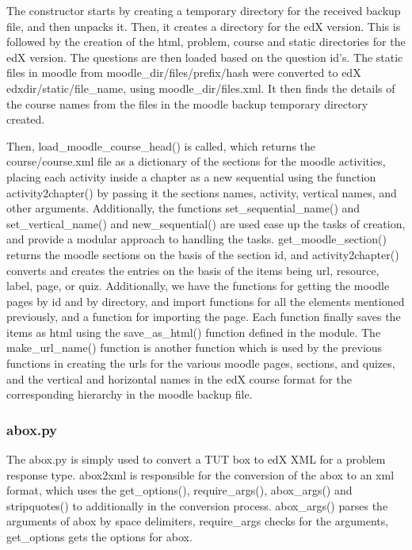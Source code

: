 \documentclass[14pt]{article}
\begin{document}
The constructor starts by creating a temporary directory for the received backup file, and then unpacks it. Then, it creates a directory for the edX version. This is followed by the creation of the html, problem, course and static directories for the edX version. The questions are then loaded based on the question id's. The static files in moodle from moodle\_dir/files/prefix/hash were  converted to edX edxdir/static/file\_name, using moodle\_dir/files.xml. It then finds the details of the course names from the files in the moodle backup temporary directory created.

Then, load\_moodle\_course\_head() is called, which returns the course/course.xml file as a dictionary of the sections for the moodle activities, placing each activity inside a chapter as a new sequential using the function activity2chapter() by passing it the sections names, activity, vertical names, and other arguments. Additionally, the functions set\_sequential\_name() and set\_vertical\_name() and new\_sequential() are used ease up the tasks of creation, and provide a modular approach to handling the tasks. get\_moodle\_section() returns the moodle sections on the basis of the section id, and activity2chapter() converts and creates the entries on the basis of the items being url, resource, label, page, or quiz. Additionally, we have the functions for getting the moodle pages by id and by directory, and import functions for all the elements mentioned previously, and a function for importing the page. Each function finally saves the items as html using the save\_as\_html() function defined in the module. The make\_url\_name() function is another function which is used by the previous functions in creating the urls for the various moodle pages, sections, and quizes, and the vertical and horizontal names in the edX course format for the corresponding hierarchy in the moodle backup file.

\subsubsection{abox.py}
The abox.py is simply used to convert a TUT box to edX XML for a problem response type. abox2xml is responsible for the conversion of the abox to an xml format, which uses the get\_options(), require\_args(), abox\_args() and stripquotes() to additionally in the conversion process. abox\_args() parses the arguments of abox by space delimiters, require\_args checks for the arguments, get\_options gets the options for abox.
\end{document}
